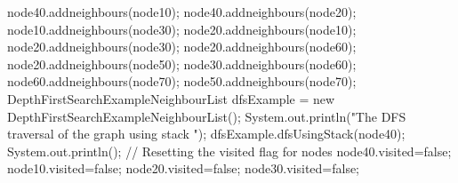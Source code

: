 \documentclass{report}
\begin{document}
 		\hspace*{1cm}node40.addneighbours(node10);\newline
		\hspace*{1cm}node40.addneighbours(node20);\newline
		\hspace*{1cm}node10.addneighbours(node30);\newline
        \hspace*{1cm}node20.addneighbours(node10);\newline
		\hspace*{1cm}node20.addneighbours(node30);\newline
		\hspace*{1cm}node20.addneighbours(node60);\newline
		\hspace*{1cm}node20.addneighbours(node50);\newline
		\hspace*{1cm}node30.addneighbours(node60);\newline
		\hspace*{1cm}node60.addneighbours(node70);\newline
		\hspace*{1cm}node50.addneighbours(node70);\newline
 		\hspace*{1cm}DepthFirstSearchExampleNeighbourList dfsExample = new DepthFirstSearchExampleNeighbourList();\newline
 		\hspace*{1cm}System.out.println("The DFS traversal of the graph using stack ");\newline
		\hspace*{1cm}dfsExample.dfsUsingStack(node40);\newline
 		\hspace*{1cm}System.out.println();\newline
 		\hspace*{1cm}// Resetting the visited flag for nodes\newline
		\hspace*{1cm}node40.visited=false;\newline
		\hspace*{1cm}node10.visited=false;\newline
		\hspace*{1cm}node20.visited=false;\newline
		\hspace*{1cm}node30.visited=false;\newline
\end{document}
